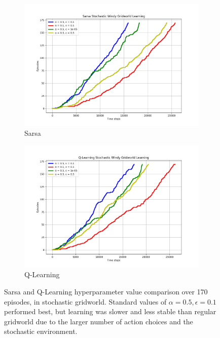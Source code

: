 \documentclass{article}
\begin{document}
\begin{figure}[h!]
  \centering
  \begin{subfigure}{0.45\textwidth} 
    \includegraphics[width=\textwidth]{sarsa_stochastic.png}
    \caption{Sarsa}
  \end{subfigure}
  \hspace{0.05\textwidth}  
  \begin{subfigure}{0.45\textwidth}  
    \includegraphics[width=\textwidth]{q_stochastic.png}
    \caption{Q-Learning}
  \end{subfigure}
  \caption{Sarsa and Q-Learning hyperparameter value comparison over 170 episodes, in stochastic gridworld. Standard values of $\alpha = 0.5, \epsilon = 0.1$ performed best, but learning was slower and less stable than regular gridworld due to the larger number of action choices and the stochastic environment.}
  \label{fig:stochastic_hyperparam}
\end{figure}
\end{document}
